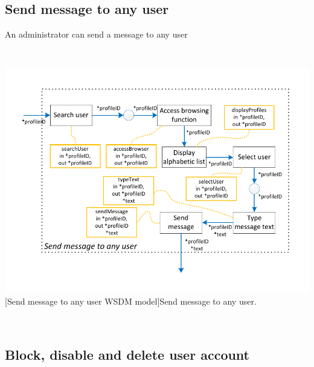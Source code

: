\documentclass[11pt, a4paper,svglistings,oneside]{book}
\begin{document}
\subsection{Send message to any user}

An administrator can send a message to any user

$\;$ \\
\noindent\begin{minipage}{\textwidth}
    \centering
   \includegraphics[scale=1]{nav_SendMessageAnyUser.pdf}
 [Send message to any user WSDM model]{Send message to any user.}
\end{minipage}
$\;$ \\ 

\subsection{Block, disable and delete user account}
\end{document}
